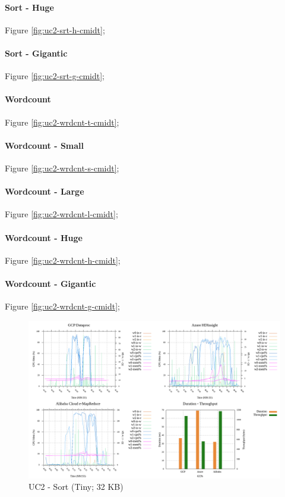 \documentclass[review]{elsarticle}
\begin{document}
\paragraph{Sort - Huge} Figure \ref{fig:uc2-srt-h-cmidt}; 
\paragraph{Sort - Gigantic} Figure \ref{fig:uc2-srt-g-cmidt}; 

\paragraph{Wordcount} Figure \ref{fig:uc2-wrdcnt-t-cmidt}; 
\paragraph{Wordcount - Small} Figure \ref{fig:uc2-wrdcnt-s-cmidt}; 
\paragraph{Wordcount - Large} Figure \ref{fig:uc2-wrdcnt-l-cmidt}; 
\paragraph{Wordcount - Huge} Figure \ref{fig:uc2-wrdcnt-h-cmidt}; 
\paragraph{Wordcount - Gigantic} Figure \ref{fig:uc2-wrdcnt-g-cmidt}; 


\begin{figure}[p]
	\caption{UC2 - Sort (Tiny; 32 KB)}
	\label{fig:uc2-srt-t-cmidt}
	\includegraphics[width=\textwidth]{uc2-srt-t-cmidt}
	\centering
\end{figure}
\end{document}
